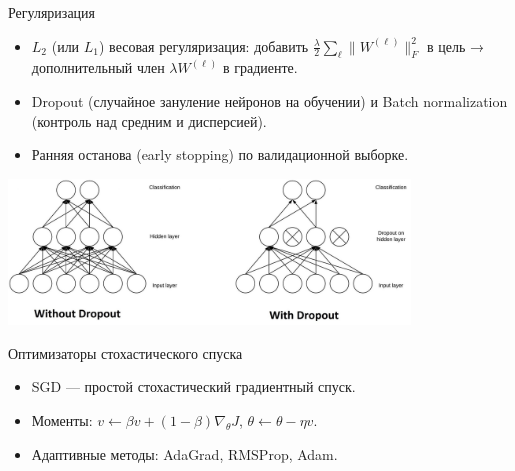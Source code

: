 \documentclass[notheorems, handout]{beamer}
\begin{document}
\begin{frame}{Регуляризация}
  \begin{itemize}
    \item $L_2$ (или $L_1$) весовая регуляризация: добавить $\frac{\lambda}{2}\sum_\ell \|W^{(\ell)}\|_F^2$ в цель → дополнительный член $\lambda W^{(\ell)}$ в градиенте.
    \item Dropout (случайное зануление нейронов на обучении) и Batch normalization (контроль над средним и дисперсией).
    \item Ранняя останова (early stopping) по валидационной выборке.
  \end{itemize}
  
    \centering
          \includegraphics[width=0.8\textwidth]{img/dropout.png}
\end{frame}

\begin{frame}{Оптимизаторы стохастического спуска}
  \begin{itemize}
    \item SGD --- простой стохастический градиентный спуск.
    \item Моменты: $v\leftarrow \beta v + (1-\beta)\nabla_\theta J$, $\theta\leftarrow\theta-\eta v$.
    \item Адаптивные методы: AdaGrad, RMSProp, Adam.
  \end{itemize}
\end{frame}
\end{document}
